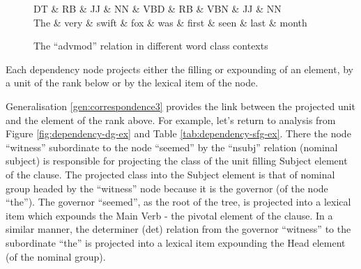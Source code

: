     \begin{figure}[!ht]
        \centering
        \begin{dependency}
            \begin{deptext}[column sep = 1ex, row sep=.1ex]
                DT \& RB \& JJ \& NN \& VBD \& RB \& VBN \& JJ \& NN \\
                The \& very \& swift \& fox \& was \& first \& seen \& last \& month \\ 
            \end{deptext}
        \end{dependency}
        \caption{The ``advmod'' relation in different word class contexts} %
        \label{fig:dependency-advmod}
    \end{figure}
    

    \begin{generalization}\label{gen:correspondence3}
        Each dependency node projects either the filling or expounding of an element, by a unit of the rank below or by the lexical item of the node. 
    \end{generalization}

    Generalisation \ref{gen:correspondence3} provides the link between the projected unit and the element of the rank above. For example, let's return to analysis from Figure \ref{fig:dependency-dg-ex} and Table \ref{tab:dependency-sfg-ex}. There the node ``witness'' subordinate to the node ``seemed'' by the ``nsubj'' relation (nominal subject) is responsible for projecting the class of the unit filling  Subject element of the clause. The projected class into the Subject element is that of nominal group headed by the ``witness'' node because it is the governor (of the node ``the''). The governor ``seemed'', as the root of the tree, is projected into a lexical item which expounds the Main Verb - the pivotal element of the clause. In a similar manner, the determiner (det) relation from the governor ``witness'' to the subordinate ``the'' is projected into a lexical item expounding the Head element (of the nominal group).

